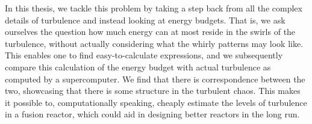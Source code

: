 In this thesis, we tackle this problem by taking a step back from all the complex details of turbulence and instead looking at energy budgets. That is, we ask ourselves the question how much energy can at most reside in the swirls of the turbulence, without actually considering what the whirly patterns may look like. This enables one to find easy-to-calculate expressions, and we subsequently compare this calculation of the energy budget with actual turbulence as computed by a supercomputer. We find that there is correspondence between the two, showcasing that there is some structure in the turbulent chaos. This makes it possible to, computationally speaking, cheaply estimate the levels of turbulence in a fusion reactor, which could aid in designing better reactors in the long run. 